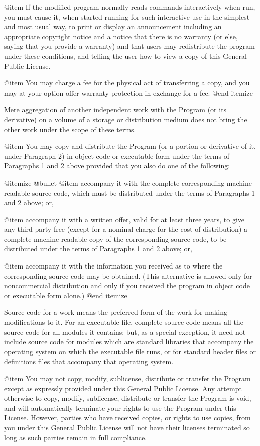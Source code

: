 @item
If the modified program normally reads commands interactively when
run, you must cause it, when started running for such interactive use
in the simplest and most usual way, to print or display an
announcement including an appropriate copyright notice and a notice
that there is no warranty (or else, saying that you provide a
warranty) and that users may redistribute the program under these
conditions, and telling the user how to view a copy of this General
Public License.

@item
You may charge a fee for the physical act of transferring a
copy, and you may at your option offer warranty protection in
exchange for a fee.
@end itemize

Mere aggregation of another independent work with the Program (or its
derivative) on a volume of a storage or distribution medium does not bring
the other work under the scope of these terms.

@item
You may copy and distribute the Program (or a portion or derivative of
it, under Paragraph 2) in object code or executable form under the terms of
Paragraphs 1 and 2 above provided that you also do one of the following:

@itemize @bullet
@item
accompany it with the complete corresponding machine-readable
source code, which must be distributed under the terms of
Paragraphs 1 and 2 above; or,

@item
accompany it with a written offer, valid for at least three
years, to give any third party free (except for a nominal charge
for the cost of distribution) a complete machine-readable copy of the
corresponding source code, to be distributed under the terms of
Paragraphs 1 and 2 above; or,

@item
accompany it with the information you received as to where the
corresponding source code may be obtained.  (This alternative is
allowed only for noncommercial distribution and only if you
received the program in object code or executable form alone.)
@end itemize

Source code for a work means the preferred form of the work for making
modifications to it.  For an executable file, complete source code means
all the source code for all modules it contains; but, as a special
exception, it need not include source code for modules which are standard
libraries that accompany the operating system on which the executable
file runs, or for standard header files or definitions files that
accompany that operating system.

@item
You may not copy, modify, sublicense, distribute or transfer the
Program except as expressly provided under this General Public License.
Any attempt otherwise to copy, modify, sublicense, distribute or transfer
the Program is void, and will automatically terminate your rights to use
the Program under this License.  However, parties who have received
copies, or rights to use copies, from you under this General Public
License will not have their licenses terminated so long as such parties
remain in full compliance.

